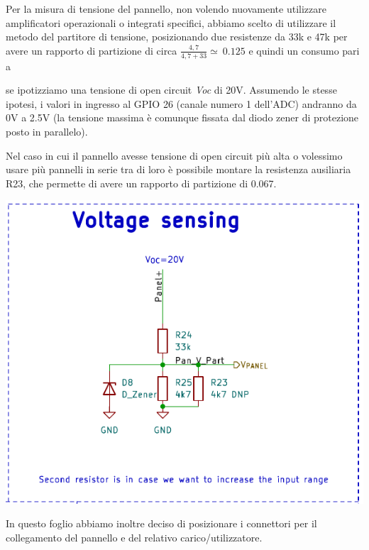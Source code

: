 Per la misura di tensione del pannello, non volendo nuovamente
utilizzare amplificatori operazionali o integrati specifici, abbiamo
scelto di utilizzare il metodo del partitore di tensione, posizionando
due resistenze da 33k e 47k per avere un rapporto di partizione di circa
\(\frac{4,7}{4,7 + 33} \simeq \ 0.125\) e quindi un consumo pari a 



se ipotizziamo una tensione di open circuit \emph{Voc} di 20V.
Assumendo le stesse ipotesi, i valori in ingresso al
GPIO 26 (canale numero 1 dell'ADC) andranno da 0V a 2.5V (la tensione
massima è comunque fissata dal diodo zener di protezione posto in
parallelo).



Nel caso in cui il pannello avesse tensione di open circuit più alta o
volessimo usare più pannelli in serie tra di loro è possibile montare la
resistenza ausiliaria R23, che permette di avere un rapporto di
partizione di 0.067.



\begin{center}
\includegraphics[scale=0.7]{figures/image62.png}
\captionsetup{type=figure}
\end{center}

In questo foglio abbiamo inoltre deciso di posizionare i connettori per
il collegamento del pannello e del relativo carico/utilizzatore.

